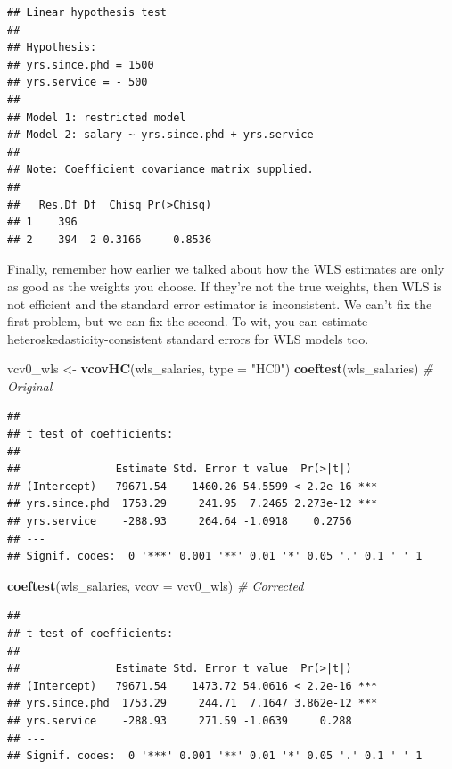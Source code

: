 \documentclass[12pt,oneside,openany]{book}
\newenvironment{Shaded}{\begin{snugshade}}{\end{snugshade}}
\newcommand{\KeywordTok}[1]{\textcolor[rgb]{0.13,0.29,0.53}{\textbf{#1}}}
\newcommand{\DataTypeTok}[1]{\textcolor[rgb]{0.13,0.29,0.53}{#1}}
\newcommand{\StringTok}[1]{\textcolor[rgb]{0.31,0.60,0.02}{#1}}
\newcommand{\CommentTok}[1]{\textcolor[rgb]{0.56,0.35,0.01}{\textit{#1}}}
\newcommand{\NormalTok}[1]{#1}
\begin{document}
\begin{verbatim}
## Linear hypothesis test
## 
## Hypothesis:
## yrs.since.phd = 1500
## yrs.service = - 500
## 
## Model 1: restricted model
## Model 2: salary ~ yrs.since.phd + yrs.service
## 
## Note: Coefficient covariance matrix supplied.
## 
##   Res.Df Df  Chisq Pr(>Chisq)
## 1    396                     
## 2    394  2 0.3166     0.8536
\end{verbatim}

Finally, remember how earlier we talked about how the WLS estimates are
only as good as the weights you choose. If they're not the true weights,
then WLS is not efficient and the standard error estimator is
inconsistent. We can't fix the first problem, but we can fix the second.
To wit, you can estimate heteroskedasticity-consistent standard errors
for WLS models too.

\begin{Shaded}
\begin{Highlighting}[]
\NormalTok{vcv0_wls <-}\StringTok{ }\KeywordTok{vcovHC}\NormalTok{(wls_salaries, }\DataTypeTok{type =} \StringTok{"HC0"}\NormalTok{)}
\KeywordTok{coeftest}\NormalTok{(wls_salaries)  }\CommentTok{# Original}
\end{Highlighting}
\end{Shaded}

\begin{verbatim}
## 
## t test of coefficients:
## 
##               Estimate Std. Error t value  Pr(>|t|)    
## (Intercept)   79671.54    1460.26 54.5599 < 2.2e-16 ***
## yrs.since.phd  1753.29     241.95  7.2465 2.273e-12 ***
## yrs.service    -288.93     264.64 -1.0918    0.2756    
## ---
## Signif. codes:  0 '***' 0.001 '**' 0.01 '*' 0.05 '.' 0.1 ' ' 1
\end{verbatim}

\begin{Shaded}
\begin{Highlighting}[]
\KeywordTok{coeftest}\NormalTok{(wls_salaries, }\DataTypeTok{vcov =}\NormalTok{ vcv0_wls)  }\CommentTok{# Corrected}
\end{Highlighting}
\end{Shaded}

\begin{verbatim}
## 
## t test of coefficients:
## 
##               Estimate Std. Error t value  Pr(>|t|)    
## (Intercept)   79671.54    1473.72 54.0616 < 2.2e-16 ***
## yrs.since.phd  1753.29     244.71  7.1647 3.862e-12 ***
## yrs.service    -288.93     271.59 -1.0639     0.288    
## ---
## Signif. codes:  0 '***' 0.001 '**' 0.01 '*' 0.05 '.' 0.1 ' ' 1
\end{verbatim}
\end{document}
